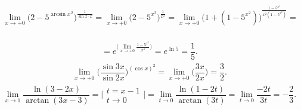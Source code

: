 \documentclass[12pt]{article}
\begin{document}
$$
\begin{array}{l}
\lim\limits_{x\rightarrow+0}\biggl(2-5^{\arcsin{x^2}}\biggr)^{\frac{1}{\sin{x}\cdot x}} = 
\lim\limits_{x\rightarrow+0}\biggl(2-5^{x^2}\biggr)^{\frac{1}{x^2}} =
\lim\limits_{x\rightarrow+0}\biggl(1+(1-5^{x^2})\biggr)^{\frac{1-5^{x^2}}{x^2(1-5^{x^2})}} = 
\end{array}
$$ \\
$$
\begin{array}{l}
= e^{\biggl(\lim\limits_{x\rightarrow+0}\frac{1-5^{x^2}}{x^2}\biggl)} = e^{\ln{5}} = \dfrac{1}{5}.
\end{array}
$$
$$
\begin{array}{l}
\lim\limits_{x\rightarrow+0}\biggl(\dfrac{\sin{3x}}{\sin{2x}}\biggr)^{(\cos{x})^2} = 
\lim\limits_{x\rightarrow+0}\biggl(\dfrac{3x}{2x}\biggr) = \dfrac{3}{2}.
\end{array}
$$
$$
\begin{array}{l}
\lim\limits_{x\rightarrow1}\dfrac{\ln{(3-2x)}}{\arctan{(3x-3)}} = 
\biggl|
\begin{array}{l}
t=x-1 \\ t\rightarrow0
\end{array}
\biggr|
= \lim\limits_{t\rightarrow0}\dfrac{\ln{(1-2t)}}{\arctan{(3t)}} = \lim\limits_{t\rightarrow0}\dfrac{-2t}{3t} = -\dfrac{2}{3}.
\end{array}
$$
\newpage
\end{document}

